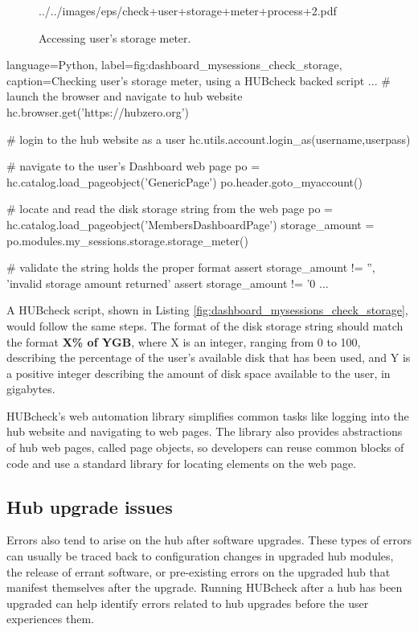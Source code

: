 \documentclass[letterpaper]{scrartcl}
\begin{document}
\begin{figure}[H]
\begin{minipage}[c]{0.48\linewidth}
      {../../images/eps/check+user+storage+meter+process+2.pdf}
    \caption{Accessing user's storage meter.}
    \label{fig:check_user_storage_meter_process}
  \end{minipage}
\end{figure}

\begin{xcode}{%
  language=Python,%
  label=fig:dashboard_mysessions_check_storage,%
  caption={Checking user's storage meter, using a HUBcheck backed script} %
}
...
# launch the browser and navigate to hub website
hc.browser.get('https://hubzero.org')

# login to the hub website as a user
hc.utils.account.login_as(username,userpass)

# navigate to the user's Dashboard web page
po = hc.catalog.load_pageobject('GenericPage')
po.header.goto_myaccount()

# locate and read the disk storage string from the web page
po = hc.catalog.load_pageobject('MembersDashboardPage')
storage_amount = po.modules.my_sessions.storage.storage_meter()

# validate the string holds the proper format
assert storage_amount != '', 'invalid storage amount returned'
assert storage_amount != '0%
...
\end{xcode}


A HUBcheck script, shown in Listing
\ref{fig:dashboard_mysessions_check_storage}, would follow the same steps.  The
format of the disk storage string should match the format \textbf{X\% of YGB},
where X is an integer, ranging from 0 to 100, describing the percentage of the
user's available disk that has been used, and Y is a positive integer
describing the amount of disk space available to the user, in gigabytes.

HUBcheck's web automation library simplifies common tasks like logging into the
hub website and navigating to web pages. The library also provides abstractions
of hub web pages, called page objects, so developers can reuse common blocks of
code and use a standard library for locating elements on the web page.


\subsection{Hub upgrade issues}

Errors also tend to arise on the hub after software upgrades.  These types of
errors can usually be traced back to configuration changes in upgraded hub
modules, the release of errant software, or pre-existing errors on the upgraded
hub that manifest themselves after the upgrade. Running HUBcheck after a hub
has been upgraded can help identify errors related to hub upgrades before the
user experiences them.
\end{document}
